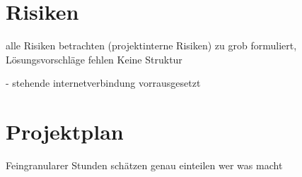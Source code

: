 \documentclass[12pt]{scrartcl}
\begin{document}

\section{Risiken}

alle Risiken betrachten (projektinterne Risiken)
zu grob formuliert, Lösungsvorschläge fehlen
Keine Struktur

- stehende internetverbindung vorrausgesetzt


\section{Projektplan}

Feingranularer
Stunden schätzen
genau einteilen wer was macht

\end{document}
